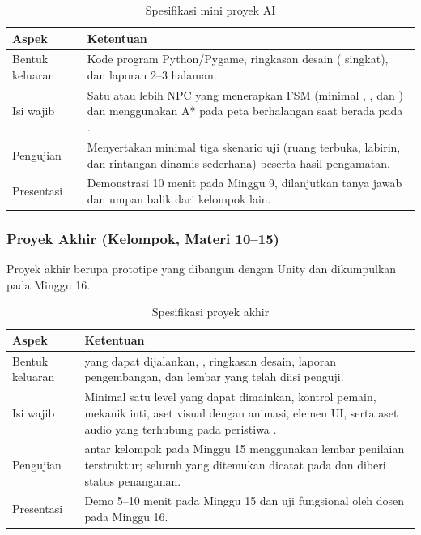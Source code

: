 \begin{table}[htbp]
\centering
\caption{Spesifikasi mini proyek AI}
\label{tab:miniproyek}
\begin{tabularx}{\textwidth}{@{}L{3.4cm} Y@{}}
\toprule
\headrow \textbf{Aspek} & \textbf{Ketentuan} \\
\midrule
Bentuk keluaran &
Kode program Python/Pygame, ringkasan desain ( singkat), dan laporan  2--3 halaman. \\
\addlinespace
Isi wajib &
Satu atau lebih NPC yang menerapkan FSM (minimal , , dan ) dan menggunakan A* pada peta berhalangan saat berada pada . \\
\addlinespace
Pengujian &
Menyertakan minimal tiga skenario uji (ruang terbuka, labirin, dan rintangan dinamis sederhana) beserta hasil pengamatan. \\
\addlinespace
Presentasi &
Demonstrasi 10 menit pada Minggu 9, dilanjutkan tanya jawab dan umpan balik dari kelompok lain. \\
\bottomrule
\end{tabularx}
\end{table}

\subsubsection{Proyek Akhir (Kelompok, Materi 10--15)}

Proyek akhir berupa prototipe  yang dibangun dengan Unity dan
dikumpulkan pada Minggu 16.

\begin{table}[htbp]
\centering
\caption{Spesifikasi proyek akhir}
\label{tab:proyekakhir}
\begin{tabularx}{\textwidth}{@{}L{3.4cm} Y@{}}
\toprule
\headrow \textbf{Aspek} & \textbf{Ketentuan} \\
\midrule
Bentuk keluaran &
 yang dapat dijalankan, , ringkasan desain, laporan pengembangan, dan lembar  yang telah diisi penguji. \\
\addlinespace
Isi wajib &
Minimal satu level yang dapat dimainkan, kontrol pemain, mekanik inti, aset visual dengan animasi, elemen UI, serta aset audio yang terhubung pada peristiwa . \\
\addlinespace
Pengujian &
 antar kelompok pada Minggu 15 menggunakan lembar penilaian terstruktur; seluruh  yang ditemukan dicatat pada  dan diberi status penanganan. \\
\addlinespace
Presentasi &
Demo 5--10 menit pada Minggu 15 dan uji fungsional oleh dosen pada Minggu 16. \\
\bottomrule
\end{tabularx}
\end{table}

